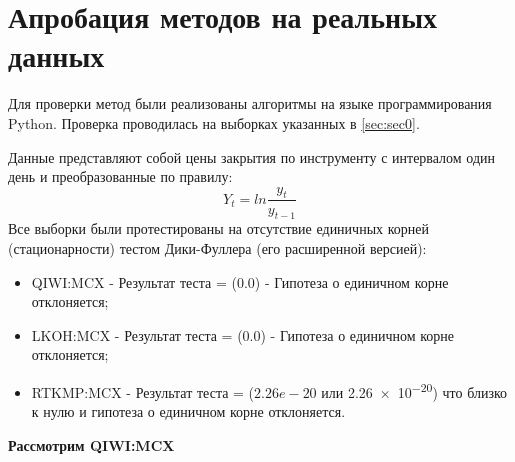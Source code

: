 \documentclass[a4paper,14pt,russian]{extarticle}
\begin{document}
	\section{\label{sec:sec3}Апробация методов на реальных данных}
	Для проверки метод были реализованы алгоритмы на языке программирования Python. Проверка проводилась на выборках указанных в \ref{sec:sec0}.
	\par
	Данные представляют собой цены закрытия по инструменту с интервалом один день и преобразованные по правилу:
	\begin{equation}
		Y_t = ln\frac{y_t}{y_{t - 1}}
	\label{eq:10}
	\end{equation}
	 Все выборки были протестированы на отсутствие единичных корней (стационарности) тестом Дики-Фуллера (его расширенной версией):
	\begin{itemize}
		\item QIWI:MCX - Результат теста = ($0.0$) - Гипотеза о единичном корне отклоняется;
		\item LKOH:MCX - Результат теста = ($0.0$) - Гипотеза о единичном корне отклоняется;
		\item RTKMP:MCX - Результат теста =  ($2.26e-20$ или \num{2.26e-20}) что близко к нулю и гипотеза о единичном корне отклоняется.
	\end{itemize}
	
	\textbf{Рассмотрим QIWI:MCX}
	
\end{document}
